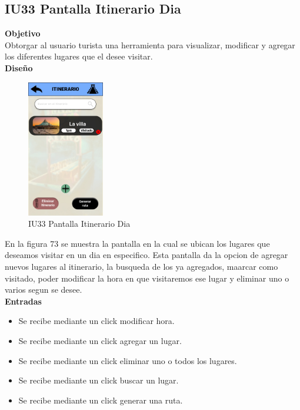 \subsection{\textbf{IU33 Pantalla Itinerario Dia}}
\textbf{Objetivo}\\
Obtorgar al usuario turista una herramienta para visualizar, modificar y agregar los diferentes lugares que el desee visitar.\\
\vspace{15pt}
\textbf{Diseño}\\
\begin{figure}[htbp]
    \centering 
    \includegraphics[width=0.3\textwidth]{Pantallas Prototipo3/IU33 Pantalla Itinerario Dia.jpg} 
    \caption{IU33 Pantalla Itinerario Dia} 
    \label{fig:Pantalla de itinerarios} 
\end{figure}

En la figura 73 se muestra la pantalla en la cual se ubican los lugares que deseamos visitar en un dia en especifico. Esta pantalla da la opcion de agregar nuevos lugares al itinerario, la busqueda de los ya agregados, maarcar como visitado, poder modificar la hora en que visitaremos ese lugar y eliminar uno o varios segun se desee.\\

\textbf{Entradas}
\begin{itemize}
    \item Se recibe mediante un click modificar hora.
     \item Se recibe mediante un click agregar un lugar.
 \item Se recibe mediante un click eliminar uno o todos los lugares.
 \item Se recibe mediante un click buscar un lugar. 
 \item Se recibe mediante un click generar una ruta.
\end{itemize}

